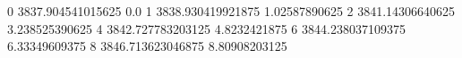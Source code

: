 0 3837.904541015625 0.0
1 3838.930419921875 1.02587890625
2 3841.14306640625 3.238525390625
4 3842.727783203125 4.8232421875
6 3844.238037109375 6.33349609375
8 3846.713623046875 8.80908203125
